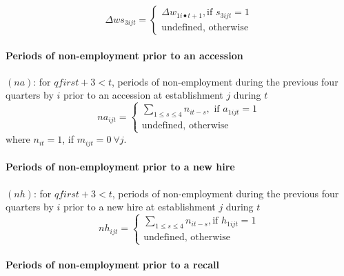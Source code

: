 \begin{equation}
\Delta ws_{3ijt}=\left\{ 
\begin{array}{l}
{\Delta w_{1i\bullet t+1},}\text{if }{s_{3ijt}=1} \\ 
\text{{undefined, otherwise}}%
\end{array}%
\right.
\end{equation}

\paragraph{Periods of non-employment prior to an accession}


$\left( na\right) $: for $qfirst+3<t$, periods of non-employment during the
previous four quarters by $i$ prior to an accession at establishment $j$
during $t$ 
\begin{equation}
na_{ijt}=\left\{ 
\begin{array}{l}
{\sum\limits_{1\leqslant s\leqslant 4}{n_{it-s}},\mbox{ if }a_{1ijt}=1} \\ 
\text{{undefined, otherwise}}%
\end{array}%
\right.
\end{equation}%
where $n_{it}=1$, if $m_{ijt}=0\ \forall j$.

\paragraph{Periods of non-employment prior to a new hire}


$\left( nh\right) $: for $qfirst+3<t$, periods of non-employment during the
previous four quarters by $i$ prior to a new hire at establishment $j$
during $t$ 
\begin{equation}
nh_{ijt}=\left\{ 
\begin{array}{l}
{\sum\limits_{1\leqslant s\leqslant 4}{n_{it-s}},}\text{if }{h_{1ijt}=1} \\ 
\text{{undefined, otherwise}}%
\end{array}%
\right.
\end{equation}

\paragraph{Periods of non-employment prior to a recall}

